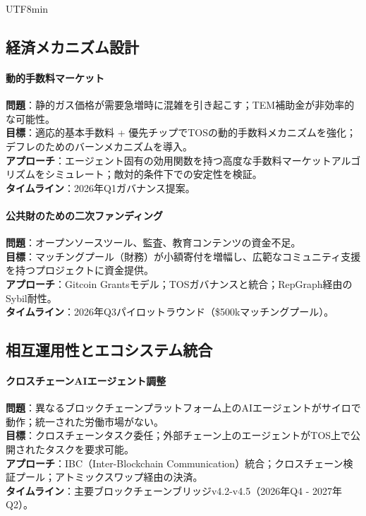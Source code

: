 \documentclass[11pt]{article}
\begin{document}
\begin{CJK}{UTF8}{min}
\begin{itemize}[noitemsep]
\subsection{経済メカニズム設計}

\paragraph{動的手数料マーケット}
\textbf{問題}：静的ガス価格が需要急増時に混雑を引き起こす；TEM補助金が非効率的な可能性。\\
\textbf{目標}：適応的基本手数料 + 優先チップでTOSの動的手数料メカニズムを強化；デフレのためのバーンメカニズムを導入。\\
\textbf{アプローチ}：エージェント固有の効用関数を持つ高度な手数料マーケットアルゴリズムをシミュレート；敵対的条件下での安定性を検証。\\
\textbf{タイムライン}：2026年Q1ガバナンス提案。

\paragraph{公共財のための二次ファンディング}
\textbf{問題}：オープンソースツール、監査、教育コンテンツの資金不足。\\
\textbf{目標}：マッチングプール（財務）が小額寄付を増幅し、広範なコミュニティ支援を持つプロジェクトに資金提供。\\
\textbf{アプローチ}：Gitcoin Grantsモデル；TOSガバナンスと統合；RepGraph経由のSybil耐性。\\
\textbf{タイムライン}：2026年Q3パイロットラウンド（\$500kマッチングプール）。

\subsection{相互運用性とエコシステム統合}

\paragraph{クロスチェーンAIエージェント調整}
\textbf{問題}：異なるブロックチェーンプラットフォーム上のAIエージェントがサイロで動作；統一された労働市場がない。\\
\textbf{目標}：クロスチェーンタスク委任；外部チェーン上のエージェントがTOS上で公開されたタスクを要求可能。\\
\textbf{アプローチ}：IBC（Inter-Blockchain Communication）統合；クロスチェーン検証プール；アトミックスワップ経由の決済。\\
\textbf{タイムライン}：主要ブロックチェーンブリッジv4.2-v4.5（2026年Q4 - 2027年Q2）。


\end{itemize}
\end{CJK}
\end{document}
